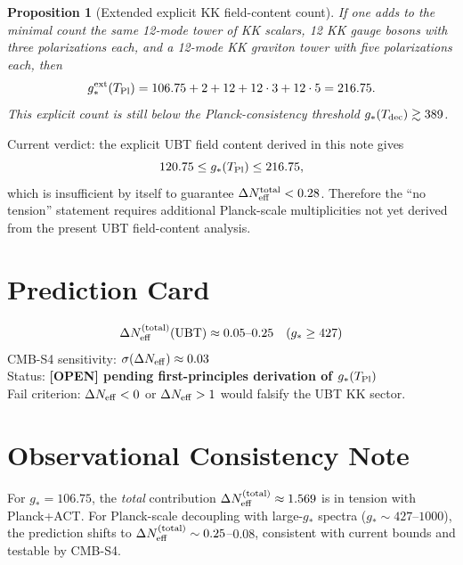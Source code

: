 \documentclass[12pt,a4paper]{article}
\newtheorem{proposition}[theorem]{Proposition}
\begin{document}
\begin{proposition}[Extended explicit KK field-content count]
If one adds to the minimal count the same 12-mode tower of KK scalars,
12 KK gauge bosons with three polarizations each, and a 12-mode KK graviton
tower with five polarizations each, then
\[
g_*^{\rm ext}(T_{\rm Pl})=106.75+2+12+12\cdot 3+12\cdot 5=216.75.
\]
This explicit count is still below the Planck-consistency threshold
$g_*(T_{\rm dec})\gtrsim 389$.
\end{proposition}

\begin{warnbox}
Current verdict: the explicit UBT field content derived in this note gives
\[
120.75 \le g_*(T_{\rm Pl}) \le 216.75,
\]
which is insufficient by itself to guarantee
$\Delta N_{\rm eff}^{\rm total}<0.28$.
Therefore the ``no tension'' statement requires additional Planck-scale
multiplicities not yet derived from the present UBT field-content analysis.
\end{warnbox}

\section{Prediction Card}
\label{sec:prediction}

\begin{predbox}[title={UBT Prediction: $\Delta N_{\rm eff}$ (KK total, g*-dependent)}]
\[
  \Delta N_{\rm eff}^{(\rm total)}(\mathrm{UBT}) \approx 0.05\text{--}0.25 \quad (g_*\ge 427)
\]
CMB-S4 sensitivity: $\sigma(\Delta N_{\rm eff}) \approx 0.03$\\
Status: \textbf{[OPEN] pending first-principles derivation of $g_*(T_{\rm Pl})$}\\[4pt]
Fail criterion: $\Delta N_{\rm eff} < 0$ or $\Delta N_{\rm eff} > 1$ would
falsify the UBT KK sector.
\end{predbox}

\section{Observational Consistency Note}
\label{sec:consistency}

\begin{warnbox}
For $g_*=106.75$, the \emph{total} contribution
$\Delta N_{\rm eff}^{(\rm total)} \approx 1.569$ is in tension with
Planck+ACT. For Planck-scale decoupling with large-$g_*$ spectra
($g_*\sim 427$--$1000$), the prediction shifts to
$\Delta N_{\rm eff}^{(\rm total)} \sim 0.25$--$0.08$, consistent with
current bounds and testable by CMB-S4.
\end{warnbox}
\end{document}
